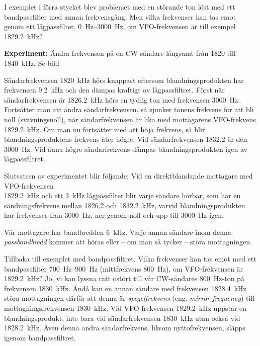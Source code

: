 I exemplet i förra stycket blev problemet med en störande ton löst med
ett bandpassfilter med annan frekvensgång.
Men vilka frekvenser kan tas emot genom ett lågpassfilter,
\SIrange{0}{3000}{\hertz}, om VFO-frekvensen är till exempel
\SI{1829,2}{\kilo\hertz}?

\textbf{Experiment:}
Ändra frekvensen på en CW-sändare långsamt från 1820 till
\SI{1840}{\kilo\hertz}.
Se bild 

Sändarfrekvensen \SI{1820}{\kilo\hertz} hörs knappast eftersom
blandningsprodukten har frekvensen \SI{9,2}{\kilo\hertz} och den dämpas kraftigt
av lågpassfiltret.
Först när sändarfrekvensen är \SI{1826,2}{\kilo\hertz} hörs en tydlig ton med
frekvensen \SI{3000}{\hertz}.
Fortsätter man att ändra sändarfrekvensen, så sjunker tonens frekvens för att
bli noll (svävningsnoll), när sändarfrekvensen är lika med mottagarens
VFO-frekvens \SI{1829,2}{\kilo\hertz}.
Om man nu fortsätter med att höja frekvens, så blir blandningsproduktens
frekvens åter högre.
Vid sändarfrekvensen 1832,2 är den \SI{3000}{\hertz}.
Vid ännu högre sändarfrekvens dämpas blandningsprodukten igen av lågpassfiltret.

Slutsatsen av experimentet blir följande:
Vid en direktblandande mottagare med VFO-frekvensen \\ \SI{1829,2}{\kilo\hertz}
och ett \SI{3}{\kilo\hertz} lågpassfilter blir varje sändare hörbar, som har en
sändningsfrekvens mellan 1826,2 och \SI{1832,2}{\kilo\hertz}, varvid
blandningsprodukten har frekvenser från \SI{3000}{\hertz}, ner genom noll och
upp till \SI{3000}{\hertz} igen.


Vår mottagare har bandbredden \SI{6}{\kilo\hertz}.
Varje annan sändare inom denna \emph{passbandbredd} kommer att höras eller --
om man så tycker -- störa mottagningen.

Tillbaka till exemplet med bandpassfiltret.
Vilka frekvenser kan tas emot med ett bandpassfilter \SIrange{700}{900}{\hertz}
(mittfrekvens \SI{800}{\hertz}), om VFO-frekvensen är \SI{1829,2}{\kilo\hertz}?
Jo, vi kan lyssna rätt ostört till vår CW-sändares \SI{800}{\hertz}-ton på
frekvensen \SI{1830}{\kilo\hertz}.
Ändå kan en annan sändare med frekvensen \SI{1828,4}{\kilo\hertz} störa
mottagningen därför att denna är \emph{spegelfrekvens} (eng. \emph{mirror
frequency}) till mottagningsfrekvensen \SI{1830}{\kilo\hertz}.
Vid VFO-frekvensen \SI{1829,2}{\kilo\hertz} uppstår en blandningsprodukt, inte
bara vid sändarfrekvensen \SI{1830}{\kilo\hertz} utan också vid
\SI{1828,2}{\kilo\hertz}.
Även denna andra sändarfrekvens, liksom nyttofrekvensen, släpps igenom
bandpassfiltret.

